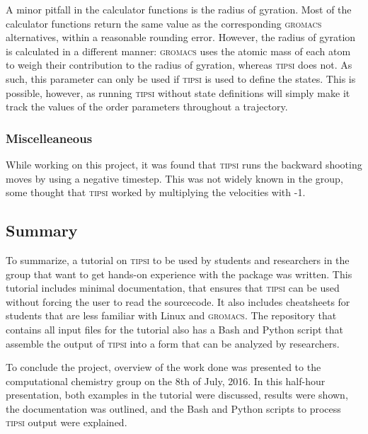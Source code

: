 \documentclass[]{article}
\begin{document}
A minor pitfall in the calculator functions is the radius of gyration. Most of the calculator functions return the same value as the corresponding \textsc{gromacs} alternatives, within a reasonable rounding error. However, the radius of gyration is calculated in a different manner: \textsc{gromacs} uses the atomic mass of each atom to weigh their contribution to the radius of gyration, whereas \textsc{tipsi} does not. As such, this parameter can only be used if \textsc{tipsi} is used to define the states. This is possible, however, as running \textsc{tipsi} without state definitions will simply make it track the values of the order parameters throughout a trajectory. 

\subsubsection*{Miscelleaneous}

While working on this project, it was found that \textsc{tipsi} runs the backward shooting moves by using a negative timestep. This was not widely known in the group, some thought that \textsc{tipsi} worked by multiplying the velocities with -1.

\subsection*{Summary}

To summarize, a tutorial on \textsc{tipsi} to be used by students and researchers in the group that want to get hands-on experience with the package was written. This tutorial includes minimal documentation, that ensures that \textsc{tipsi} can be used without forcing the user to read the sourcecode. It also includes cheatsheets for students that are less familiar with Linux and \textsc{gromacs}. The repository that contains all input files for the tutorial also has a Bash and Python script that assemble the output of \textsc{tipsi} into a form that can be analyzed by researchers.

To conclude the project, overview of the work done was presented to the computational chemistry group on the 8th of July, 2016. In this half-hour presentation, both examples in the tutorial were discussed, results were shown, the documentation was outlined, and the Bash and Python scripts to process \textsc{tipsi} output were explained.



\end{document}
